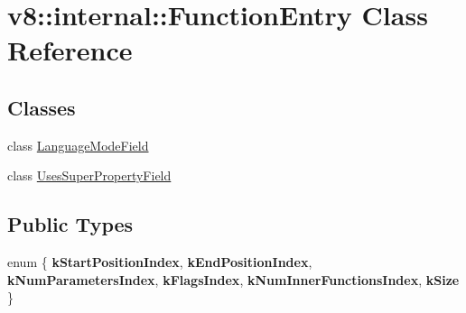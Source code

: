 \hypertarget{classv8_1_1internal_1_1FunctionEntry}{}\section{v8\+:\+:internal\+:\+:Function\+Entry Class Reference}
\label{classv8_1_1internal_1_1FunctionEntry}
\subsection*{Classes}
\begin{DoxyCompactItemize}
\item 
class \mbox{\hyperlink{classv8_1_1internal_1_1FunctionEntry_1_1LanguageModeField}{Language\+Mode\+Field}}
\item 
class \mbox{\hyperlink{classv8_1_1internal_1_1FunctionEntry_1_1UsesSuperPropertyField}{Uses\+Super\+Property\+Field}}
\end{DoxyCompactItemize}
\subsection*{Public Types}
\begin{DoxyCompactItemize}
\item 
\mbox{\label{classv8_1_1internal_1_1FunctionEntry_a7d31cdbe34a02a1a39bb692cc213e117}} 
enum \{ \newline
{\bfseries k\+Start\+Position\+Index}, 
{\bfseries k\+End\+Position\+Index}, 
{\bfseries k\+Num\+Parameters\+Index}, 
{\bfseries k\+Flags\+Index}, 
\newline
{\bfseries k\+Num\+Inner\+Functions\+Index}, 
{\bfseries k\+Size}
 \}
\end{DoxyCompactItemize}
